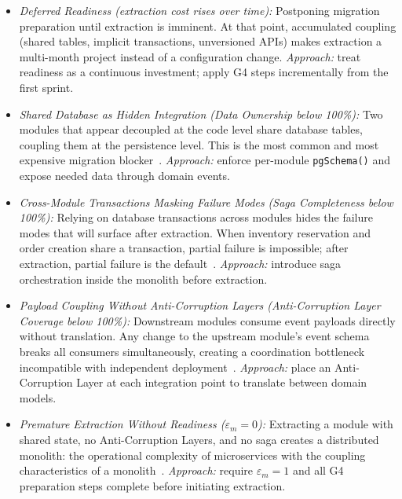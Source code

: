 \begin{itemize}[itemsep=8pt,topsep=2pt]
  \item \emph{Deferred Readiness (extraction cost rises over time):}
  Postponing migration preparation until extraction is imminent. At that point, accumulated coupling (shared tables, implicit transactions, unversioned APIs) makes extraction a multi-month project instead of a configuration change.
  \emph{Approach:} treat readiness as a continuous investment; apply G4 steps incrementally from the first sprint.

  \item \emph{Shared Database as Hidden Integration (Data Ownership below 100\%):}
  Two modules that appear decoupled at the code level share database tables, coupling them at the persistence level. This is the most common and most expensive migration blocker~\cite{fritzsch2019}.
  \emph{Approach:} enforce per-module \texttt{pgSchema()} and expose needed data through domain events.

  \item \emph{Cross-Module Transactions Masking Failure Modes (Saga Completeness below 100\%):}
  Relying on database transactions across modules hides the failure modes that will surface after extraction. When inventory reservation and order creation share a transaction, partial failure is impossible; after extraction, partial failure is the default~\cite{richardson2018microservices}.
  \emph{Approach:} introduce saga orchestration inside the monolith before extraction.

  \item \emph{Payload Coupling Without Anti-Corruption Layers (Anti-Corruption Layer Coverage below 100\%):}
  Downstream modules consume event payloads directly without translation. Any change to the upstream module's event schema breaks all consumers simultaneously, creating a coordination bottleneck incompatible with independent deployment~\cite{evans2003ddd}.
  \emph{Approach:} place an Anti-Corruption Layer at each integration point to translate between domain models.

  \item \emph{Premature Extraction Without Readiness ($\varepsilon_m = 0$):}
  Extracting a module with shared state, no Anti-Corruption Layers, and no saga creates a distributed monolith: the operational complexity of microservices with the coupling characteristics of a monolith~\cite{gravanis2021dont,newman2019monolith}.
  \emph{Approach:} require $\varepsilon_m = 1$ and all G4 preparation steps complete before initiating extraction.
\end{itemize}

